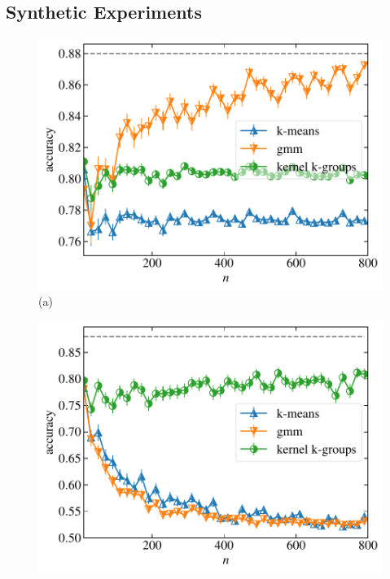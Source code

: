 \documentclass[10pt,journal,compsoc]{IEEEtran}
\begin{document}
\subsection{Synthetic Experiments}


\begin{figure}
\centering
\begin{minipage}{.4\textwidth}
\includegraphics[width=1\textwidth]{gauss_1d.pdf}\\[-2em]
(a)
\end{minipage}
\begin{minipage}{.4\textwidth}
\includegraphics[width=1\textwidth]{loggauss_1d.pdf} \\[-2em]

\end{minipage}
\end{figure}
\end{document}
